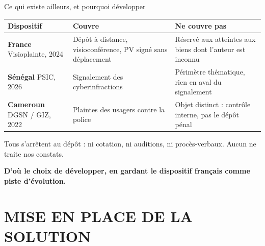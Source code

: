 \documentclass[9pt]{beamer}
\newcommand{\aretenir}[1]{%
  \vspace{2pt}%
  \begin{center}\small\color{vertPlainte}\textbf{#1}\end{center}}
\begin{document}
\begin{frame}{Ce qui existe ailleurs, et pourquoi développer}
\small
\begin{tabularx}{\textwidth}{@{}l>{\raggedright\arraybackslash}X>{\raggedright\arraybackslash}X@{}}
  \toprule
  \textbf{Dispositif} & \textbf{Couvre} & \textbf{Ne couvre pas} \\
  \midrule
  \textbf{France} \newline Visioplainte, 2024
    & Dépôt à distance, visioconférence, PV signé sans déplacement
    & Réservé aux atteintes aux biens dont l'auteur est inconnu \\
  \addlinespace
  \textbf{Sénégal} \newline PSIC, 2026
    & Signalement des cyberinfractions
    & Périmètre thématique, rien en aval du signalement \\
  \addlinespace
  \textbf{Cameroun} \newline DGSN / GIZ, 2022
    & Plaintes des usagers contre la police
    & Objet distinct : contrôle interne, pas le dépôt pénal \\
  \bottomrule
\end{tabularx}
\vspace{4pt}
\small Tous s'arrêtent au dépôt : ni cotation, ni auditions, ni procès-verbaux. Aucun ne traite nos constats.
\aretenir{D'où le choix de développer, en gardant le dispositif français comme piste d'évolution.}
\end{frame}


\section{MISE EN PLACE DE LA SOLUTION}
\end{document}
